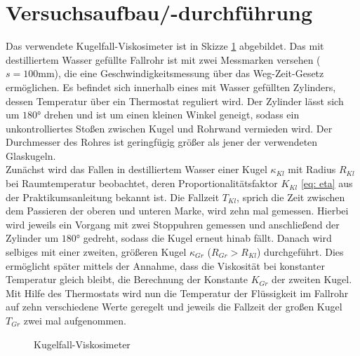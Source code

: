 \section{Versuchsaufbau/-durchführung}
Das verwendete Kugelfall-Viskosimeter ist in Skizze \ref{fig: aufbau} abgebildet. Das mit destilliertem Wasser gefüllte Fallrohr ist mit zwei Messmarken versehen ($s = 100\si{\milli\meter}$\cite{anleitung207}), die eine Geschwindigkeitsmessung über das Weg-Zeit-Gesetz ermöglichen.
Es befindet sich innerhalb eines mit Wasser gefüllten Zylinders, dessen Temperatur über ein Thermostat reguliert wird. Der Zylinder lässt sich um $180 \si{\degree}$ drehen und ist
um einen kleinen Winkel geneigt, sodass ein unkontrolliertes Stoßen zwischen Kugel und Rohrwand vermieden wird. Der Durchmesser des Rohres ist geringfügig größer als jener der verwendeten Glaskugeln.\\
Zunächst wird das Fallen in destilliertem Wasser einer Kugel $\kappa_{Kl}$ mit Radius $R_{Kl}$ bei Raumtemperatur beobachtet, deren Proportionalitätsfaktor $K_{Kl}$ \eqref{eq: eta} aus der
Praktikumsanleitung \cite{anleitung207} bekannt ist. Die Fallzeit $T_{Kl}$, sprich die Zeit zwischen dem Passieren der oberen und unteren Marke,
wird zehn mal gemessen. Hierbei wird jeweils ein Vorgang mit zwei Stoppuhren gemessen und anschließend der Zylinder um $180\si{\degree}$ gedreht, sodass die
Kugel erneut hinab fällt. Danach wird selbiges mit einer zweiten, größeren Kugel $\kappa_{Gr}$ ($R_{Gr} > R_{Kl}$) durchgeführt. Dies ermöglicht später
mittels der Annahme, dass die Viskosität bei konstanter Temperatur gleich bleibt, die Berechnung der Konstante $K_{Gr}$ der zweiten Kugel. \\
Mit Hilfe des Thermostats wird nun die Temperatur der Flüssigkeit im Fallrohr auf zehn verschiedene Werte geregelt und jeweils die Fallzeit der großen Kugel $T_{Gr}$ zwei mal aufgenommen.
\begin{figure}
  \centering
  \caption{Kugelfall-Viskosimeter \cite{anleitung207}}
  \label{fig: aufbau}
\end{figure}
